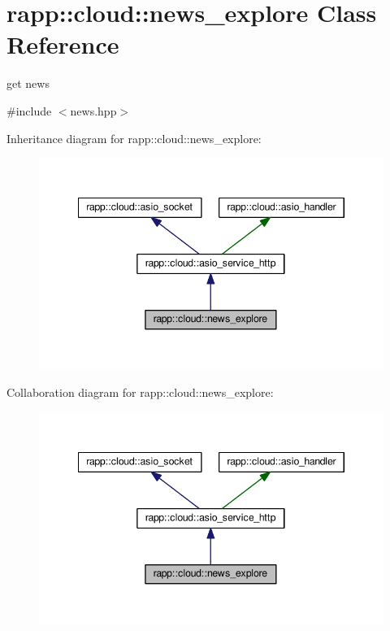 \hypertarget{classrapp_1_1cloud_1_1news__explore}{\section{rapp\-:\-:cloud\-:\-:news\-\_\-explore Class Reference}
\label{classrapp_1_1cloud_1_1news__explore}
}


get news  




{\ttfamily \#include $<$news.\-hpp$>$}



Inheritance diagram for rapp\-:\-:cloud\-:\-:news\-\_\-explore\-:
\nopagebreak
\begin{figure}[H]
\begin{center}
\leavevmode
\includegraphics[width=345pt]{classrapp_1_1cloud_1_1news__explore__inherit__graph}
\end{center}
\end{figure}


Collaboration diagram for rapp\-:\-:cloud\-:\-:news\-\_\-explore\-:
\nopagebreak
\begin{figure}[H]
\begin{center}
\leavevmode
\includegraphics[width=345pt]{classrapp_1_1cloud_1_1news__explore__coll__graph}
\end{center}
\end{figure}
